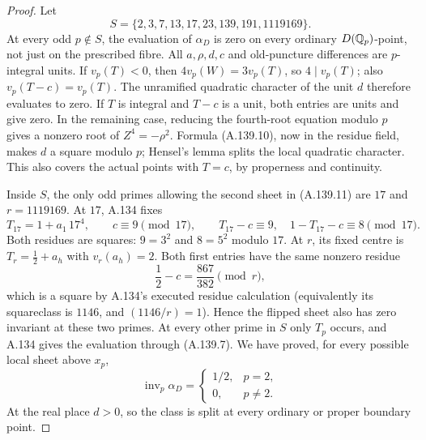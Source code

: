 \begin{proof}
Let
\[
                  S=\{2,3,7,13,17,23,139,191,1119169\}.
\tag{A.139.12}
\]
At every odd \(p\notin S\), the evaluation of \(\alpha_D\) is zero
on every ordinary \(D(\mathbb Q_p)\)-point, not just on the prescribed
fibre.  All \(a,\rho,d,c\) and old-puncture differences are
\(p\)-integral units.  If \(v_p(T)<0\), then
\(4v_p(W)=3v_p(T)\), so \(4\mid v_p(T)\);
also \(v_p(T-c)=v_p(T)\).
The unramified quadratic character of the unit \(d\) therefore
evaluates to zero.  If \(T\) is integral and \(T-c\) is a unit,
both entries are units and give zero.  In the remaining case,
reducing the fourth-root equation modulo \(p\) gives a nonzero
root of \(Z^4=-\rho^2\).  Formula (A.139.10), now in the residue
field, makes \(d\) a square modulo \(p\); Hensel's lemma splits
the local quadratic character.  This also covers the actual
points with \(T=c\), by properness and continuity.

Inside \(S\), the only odd primes allowing the second sheet
in (A.139.11) are \(17\) and \(r=1119169\).
At \(17\), A.134 fixes
\[
 T_{17}=1+a_1\,17^4,\qquad c\equiv9\pmod{17},\qquad
       T_{17}-c\equiv9,\quad 1-T_{17}-c\equiv8\pmod{17}.
\tag{A.139.13}
\]
Both residues are squares: \(9=3^2\) and \(8=5^2\) modulo \(17\).
At \(r\), its fixed centre is \(T_r=\tfrac12+a_h\) with
\(v_r(a_h)=2\).  Both first entries have the same nonzero residue
\[
            \frac12-c=\frac{867}{382}\pmod r,
\tag{A.139.14}
\]
which is a square by A.134's executed residue calculation
(equivalently its squareclass is \(1146\), and \((1146/r)=1\)).
Hence the flipped sheet also has zero invariant at these two
primes.
At every other prime in \(S\) only \(T_p\) occurs, and A.134 gives
the evaluation through (A.139.7).
We have proved, for every possible local sheet above \(x_p\),
\[
       \operatorname{inv}_p\alpha_D=
       \begin{cases}
          1/2,&p=2,\\
          0,&p\ne2.
       \end{cases}
\tag{A.139.15}
\]
At the real place \(d>0\), so the class is split at every ordinary
or proper boundary point.


\end{proof}
